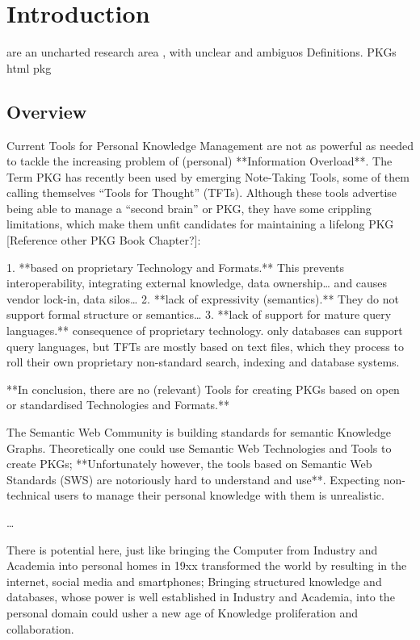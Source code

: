\chapter{Introduction}
 are an uncharted research area \cite{Balog2019PersonalKG}, with unclear and ambiguos Definitions. PKGs \Gls{html} \Gls{pkg}

\section{Overview} \label{sec:overview}

Current Tools for Personal Knowledge Management are not as powerful as needed to tackle the increasing problem of (personal) **Information Overload**. The Term PKG has recently been used by emerging Note-Taking Tools, some of them calling themselves “Tools for Thought” (TFTs). Although these tools advertise being able to manage a “second brain” or PKG, they have some crippling limitations, which make them unfit candidates for maintaining a lifelong PKG [Reference other PKG Book Chapter?]: 

1. **based on proprietary Technology and Formats.** This prevents interoperability, integrating external knowledge, data ownership… and causes vendor lock-in, data silos… 
2. **lack of expressivity (semantics).** They do not support formal structure or semantics…
3. **lack of support for mature query languages.** consequence of proprietary technology. only databases can support query languages, but TFTs are mostly based on text files, which they process to roll their own proprietary non-standard search, indexing and database systems.

**In conclusion, there are no (relevant) Tools for creating PKGs based on open or standardised Technologies and Formats.**

The Semantic Web Community is building standards for semantic Knowledge Graphs. Theoretically one could use Semantic Web Technologies and Tools to create PKGs; **Unfortunately however, the tools based on Semantic Web Standards (SWS) are notoriously hard to understand and use**. Expecting non-technical users to manage their personal knowledge with them is unrealistic.

…

There is potential here, just like bringing the Computer from Industry and Academia into personal homes in 19xx transformed the world by resulting in the internet, social media and smartphones; Bringing structured knowledge and databases, whose power is well established in Industry and Academia, into the personal domain could usher a new age of Knowledge proliferation and collaboration.

